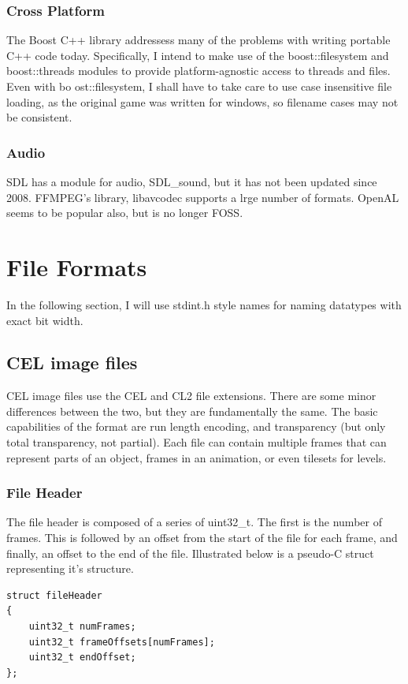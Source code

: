 \documentclass[a4paper]{article}
\begin{document}
    	\subsubsection{Cross Platform}
        The Boost C++ library addressess many of the problems with writing portable C++ code today.
        Specifically, I intend to make use of the boost::filesystem and boost::threads modules to provide platform-agnostic access to threads and files.
        Even with bo	ost::filesystem, I shall have to take care to use case insensitive file loading, as the original game was written for windows, so filename cases may not be consistent.
        
        \subsubsection{Audio}
        SDL has a module for audio, SDL\_sound\cite{sdls}, but it has not been updated since 2008.
        FFMPEG's library, libavcodec\cite{libavcodec} supports a lrge number of formats.
        OpenAL seems to be popular also, but is no longer FOSS.
\newpage
\section{File Formats}
In the following section, I will use stdint.h style names for naming datatypes with exact bit width.

\subsection{CEL image files}
	CEL image files use the CEL and CL2 file extensions. There are some minor differences between the two, but they are fundamentally the same. The basic capabilities of the format are run length encoding, and transparency (but only total transparency, not partial). Each file can contain multiple frames that can represent parts of an object, frames in an animation, or even tilesets for levels.

	\subsubsection{File Header}
	The file header is composed of a series of uint32\_t. The first is the number of frames. This is followed by an offset from the start of the file for each frame, and finally, an offset to the end of the file. Illustrated below is a pseudo-C struct representing it's structure.
	\begin{lstlisting}
struct fileHeader
{
	uint32_t numFrames;
	uint32_t frameOffsets[numFrames];
	uint32_t endOffset;
};
	\end{lstlisting}
	
\end{document}
